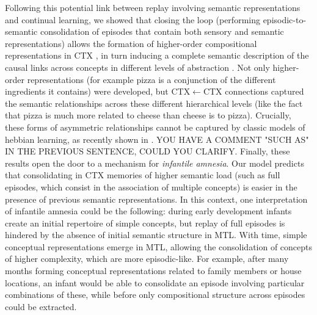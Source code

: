 \documentclass{article}
\begin{document}
Following this potential link between replay involving semantic representations and continual learning, we showed that closing the loop (performing episodic-to-semantic consolidation of episodes that contain both sensory and semantic representations) allows the formation of higher-order compositional representations in CTX , in turn inducing a complete semantic description of the causal links across concepts in different levels of abstraction . Not only higher-order representations (for example pizza is a conjunction of the different ingredients it contains) were developed, but CTX$\leftarrow$CTX connections captured the semantic relationships across these different hierarchical levels (like the fact that pizza is much more related to cheese than cheese is to pizza). Crucially, these forms of asymmetric relationships cannot be captured by classic models of hebbian learning, as recently shown in . YOU HAVE A COMMENT "SUCH AS" IN THE PREVIOUS SENTENCE, COULD YOU CLARIFY. Finally, these results open the door to a mechanism for \textit{infantile amnesia}. Our model predicts that consolidating in CTX memories of higher semantic load (such as full episodes, which consist in the association of multiple concepts) is easier in the presence of previous semantic representations. In this context, one interpretation of infantile amnesia could be the following: during early development infants create an initial repertoire of simple concepts, but replay of full episodes is hindered by the absence of initial semantic structure in MTL. With time, simple conceptual representations emerge in MTL, allowing the consolidation of concepts of higher complexity, which are more episodic-like. For example, after many months forming conceptual representations related to family members or house locations, an infant would be able to consolidate an episode involving particular combinations of these, while before only compositional structure across episodes could be extracted.
\newline\newline
\end{document}
